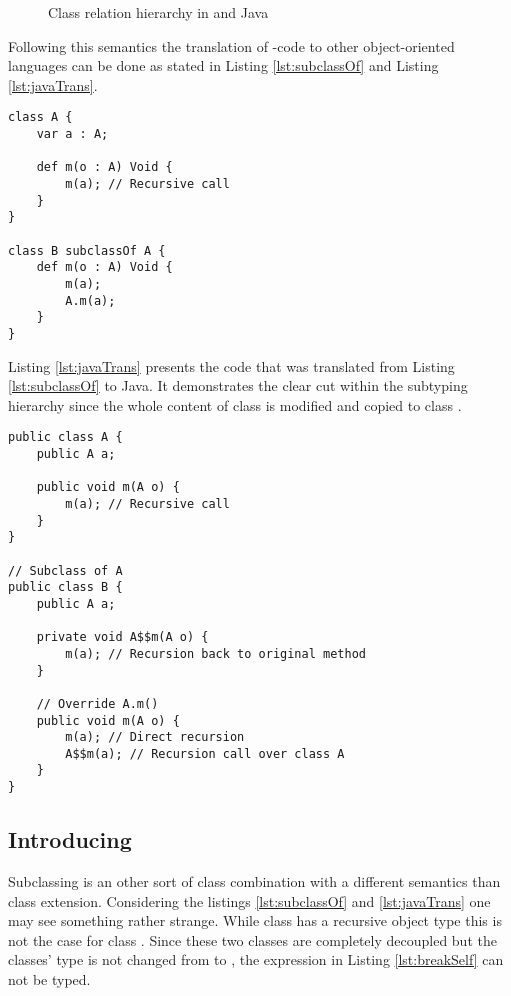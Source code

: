 \begin{figure}
	\centering
	\caption{Class relation hierarchy in \ooplss and Java}
	\label{fig:inheritHierarchy}
\end{figure}

Following this semantics the translation of \ooplss-code to
other object-oriented languages can be done as stated in Listing
\ref{lst:subclassOf} and Listing \ref{lst:javaTrans}.

\begin{lstlisting}[float=ht,language=ooplss,caption=Subclassing in \ooplss,label=lst:subclassOf]
class A {
	var a : A;

	def m(o : A) Void {
		m(a); // Recursive call
	}
}

class B subclassOf A {
	def m(o : A) Void {
		m(a);
		A.m(a);
	}
}
\end{lstlisting}

Listing \ref{lst:javaTrans} presents the code that was translated from Listing
\ref{lst:subclassOf} to Java. It demonstrates the clear cut within
the subtyping hierarchy since the whole content of class \A is modified
and copied to class \B.

\begin{lstlisting}[float=ht,caption=Subclassing translated to Java,label=lst:javaTrans]
public class A {
	public A a;

	public void m(A o) {
		m(a); // Recursive call
	}
}

// Subclass of A
public class B {
	public A a;

	private void A$$m(A o) {
		m(a); // Recursion back to original method
	}

	// Override A.m()
	public void m(A o) {
		m(a); // Direct recursion
		A$$m(a); // Recursion call over class A
	}
}
\end{lstlisting}


\subsection{Introducing \mytype}
Subclassing is an other sort of class combination with a
different semantics than class extension. Considering the listings
\ref{lst:subclassOf} and \ref{lst:javaTrans} one may see something rather
strange. While class \A has a recursive object type this is not the case
for class \B. Since these two classes are completely decoupled but the
classes' type is not changed from \A to \B, the expression in Listing
\ref{lst:breakSelf} can not be typed.

